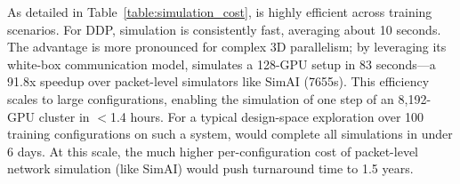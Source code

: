 As detailed in Table~\ref{table:simulation_cost}, \sys is highly efficient across training scenarios. For DDP, simulation is consistently fast, averaging about 10 seconds. The advantage is more pronounced for complex 3D parallelism; by leveraging its white-box communication model, \sys simulates a 128-GPU setup in 83 seconds—a 91.8x speedup over packet-level simulators like SimAI (7655s). This efficiency scales to large configurations, enabling the simulation of one step of an 8,192-GPU cluster in $<$1.4 hours.
For a typical design-space exploration over 100 training configurations on such a system, \sys would complete all simulations in under 6 days.
At this scale, the much higher per-configuration cost of packet-level network simulation (like SimAI) would push turnaround time to 1.5 years.



\begin{table}[t]
\centering
\small
\renewcommand{\arraystretch}{0.8}
\caption{}
\label{table:simulation_cost_old}
\end{table}





